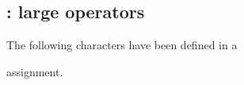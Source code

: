 \vfil\eject

\def\prevclass{}\def\prevfaml{}

\subsection{ : large operators}

The following characters have been defined
in a
\begin{disp}
\end{disp}
assignment.
\par\leavevmode\par

